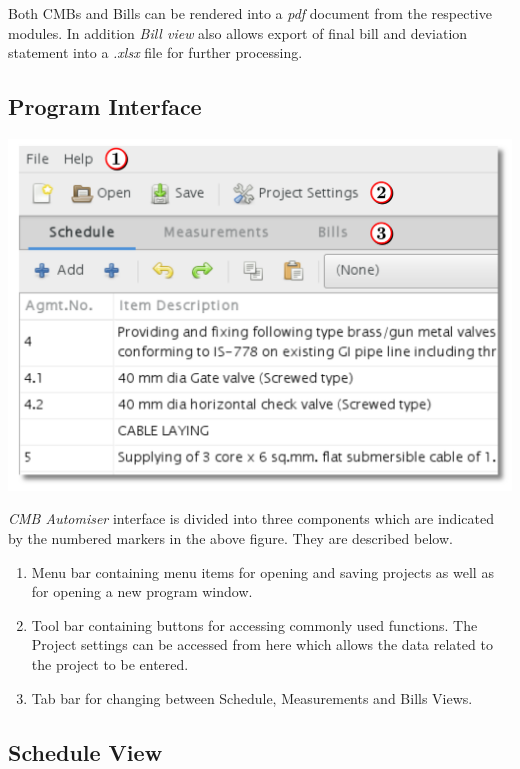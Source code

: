 \documentclass[twoside,a4paper]{refart}
\begin{document}
	 Both CMBs and Bills can be rendered into a \emph{pdf} document from the respective modules. In addition \emph{Bill view} also allows export of final bill and deviation statement into a \emph{.xlsx} file for further processing.
	 
	 \subsection{Program Interface}
	 
	 \begin{center}
	 	\includegraphics[width=1\linewidth]{screenshots/window_main.png}
	 \end{center}
	 
	 \emph{CMB Automiser} interface is divided into three components which are indicated by the numbered markers in the above figure. They are described below.
	 \begin{enumerate}
	 	\item Menu bar containing menu items for opening and saving projects as well as for opening a new program window. 
	 	\item Tool bar containing buttons for accessing commonly used functions. The Project settings can be accessed from here which allows the data related to the project to be entered.
	 	\item Tab bar for changing between Schedule, Measurements and Bills Views.
	 \end{enumerate}
	 
	 
	 
	 \subsection{Schedule View}
	 
\end{document}
